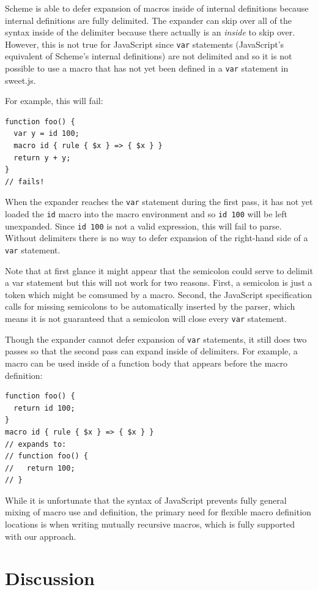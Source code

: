\documentclass[preprint,10pt]{sigplanconf}
\begin{document}
Scheme is able to defer expansion of macros inside of internal
definitions because internal definitions are fully delimited. The
expander can skip over all of the syntax inside of the delimiter
because there actually is an \emph{inside} to skip over. However, this
is not true for JavaScript since \verb!var! statements
(JavaScript's equivalent of Scheme's internal definitions) are not
delimited and so it is not possible to use a macro that has not yet
been defined in a \verb!var! statement in sweet.js.

For example, this will fail:

\begin{lstlisting}
function foo() {
  var y = id 100;
  macro id { rule { $x } => { $x } }
  return y + y;
}
// fails!
\end{lstlisting}
When the expander reaches the \verb!var! statement during the
first pass, it has not yet loaded the \verb!id! macro into the
macro environment and so \verb!id 100! will be left unexpanded.
Since \verb!id 100! is not a valid expression, this will fail to
parse.
Without delimiters there is no way to defer expansion of the
right-hand side of a \verb!var! statement.

Note that at first glance it might appear that the semicolon could
serve to delimit a var statement but this will not work for two
reasons. First, a semicolon is just a token which might be comsumed by
a macro. Second, the JavaScript specification calls for missing
semicolons to be automatically inserted by the parser, which means
it is not guaranteed that a semicolon will close every \verb!var!
statement.

Though the expander cannot defer expansion of \verb!var!
statements, it still does two passes so that
the second pass can expand inside of delimiters. For example, a macro
can be used inside of a function body that appears before the macro definition:
\begin{lstlisting}
function foo() {
  return id 100;
}
macro id { rule { $x } => { $x } }
// expands to:
// function foo() {
//   return 100;
// }
\end{lstlisting}


While it is unfortunate that the syntax of JavaScript prevents fully
general mixing of macro use and definition, the primary need for
flexible macro definition locations is when writing mutually recursive
macros, which is fully supported with our approach.

\section{Discussion}
\label{sec:discussion}
\end{document}
